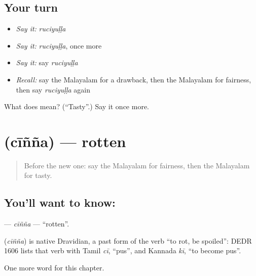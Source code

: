 \subsection*{Your turn}
\begin{itemize}
\raggedright
  \item \emph{Say it:} \emph{ruciyuḷḷa}
  \item \emph{Say it:} \emph{ruciyuḷḷa}, once more
  \item \emph{Say it:} say \emph{ruciyuḷḷa}
  \item \emph{Recall:} say the Malayalam for a drawback, then the Malayalam for fairness, then say \emph{ruciyuḷḷa} again
\end{itemize}

\begin{tcolorbox}[breakable,colback=teal!4,colframe=teal!35!black,title={Before you move on}]
What does  mean? (\textquotedblleft{}Tasty\textquotedblright{}.) Say it once more.
\end{tcolorbox}
\section[\texorpdfstring{\ml{ചീഞ്ഞ} (cīñña)}{ചീഞ്ഞ (cīñña)}]{ (cīñña) — rotten}

\label{lesson:ML-C203-cinna}



\begin{quote}
Before the new one: say the Malayalam for fairness, then the Malayalam for tasty.
\end{quote}

\subsection*{You'll want to know: }
\textbf{} — \emph{cīñña} — \textquotedblleft{}rotten\textquotedblright{}.

\begin{cousinweb}
\textbf{} (\emph{cīñña}) is native Dravidian, a past form of the verb \textquotedblleft{}to rot, be spoiled\textquotedblright{}: DEDR 1606 lists that verb with Tamil \emph{cī}, \textquotedblleft{}pus\textquotedblright{}, and Kannada \emph{kī}, \textquotedblleft{}to become pus\textquotedblright{}.
\end{cousinweb}

\begin{grammarlens}[title={What you've built}]
One more word for this chapter.
\end{grammarlens}


